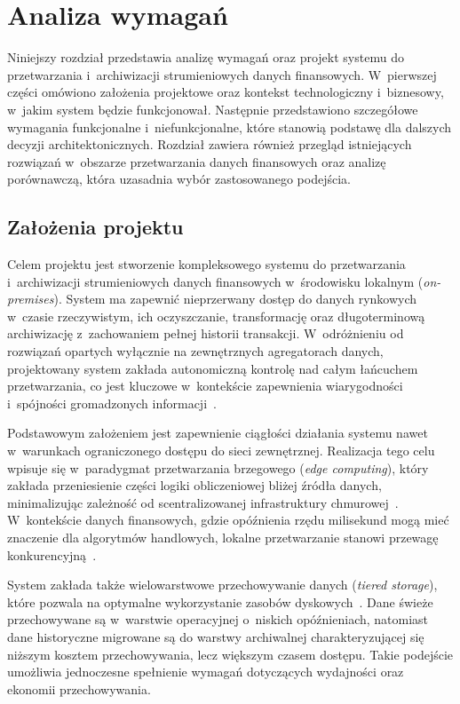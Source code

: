 \chapter{Analiza wymagań}
\label{ch:analiza}

Niniejszy rozdział przedstawia analizę wymagań oraz projekt systemu do przetwarzania i~archiwizacji strumieniowych
danych finansowych.
W~pierwszej części omówiono założenia projektowe oraz kontekst technologiczny i~biznesowy, w~jakim system będzie
funkcjonował.
Następnie przedstawiono szczegółowe wymagania funkcjonalne i~niefunkcjonalne, które stanowią podstawę dla dalszych
decyzji architektonicznych.
Rozdział zawiera również przegląd istniejących rozwiązań w~obszarze przetwarzania danych finansowych oraz analizę
porównawczą, która uzasadnia wybór zastosowanego podejścia.


\section{Założenia projektu}
\label{sec:zalozenia}

Celem projektu jest stworzenie kompleksowego systemu do przetwarzania i~archiwizacji strumieniowych danych finansowych
w~środowisku lokalnym (\textit{on-premises}).
System ma zapewnić nieprzerwany dostęp do danych rynkowych w~czasie rzeczywistym, ich oczyszczanie, transformację oraz
długoterminową archiwizację z~zachowaniem pełnej historii transakcji.
W~odróżnieniu od rozwiązań opartych wyłącznie na zewnętrznych agregatorach danych, projektowany system zakłada
autonomiczną kontrolę nad całym łańcuchem przetwarzania, co jest kluczowe w~kontekście zapewnienia wiarygodności
i~spójności gromadzonych informacji~\cite{arbitrage_finance}.

Podstawowym założeniem jest zapewnienie ciągłości działania systemu nawet w~warunkach ograniczonego dostępu do sieci
zewnętrznej.
Realizacja tego celu wpisuje się w~paradygmat przetwarzania brzegowego (\textit{edge computing}), który zakłada
przeniesienie części logiki obliczeniowej bliżej źródła danych, minimalizując zależność od scentralizowanej
infrastruktury chmurowej~\cite{edge_computing_satya}.
W~kontekście danych finansowych, gdzie opóźnienia rzędu milisekund mogą mieć znaczenie dla algorytmów handlowych,
lokalne przetwarzanie stanowi przewagę konkurencyjną~\cite{hft_colocation_advantage}.

System zakłada także wielowarstwowe przechowywanie danych (\textit{tiered storage}), które pozwala na optymalne
wykorzystanie zasobów dyskowych~\cite{unity_tiered_storage}.
Dane świeże przechowywane są w~warstwie operacyjnej o~niskich opóźnieniach, natomiast dane
historyczne migrowane są do warstwy archiwalnej charakteryzującej się niższym kosztem przechowywania, lecz większym
czasem dostępu.
Takie podejście umożliwia jednoczesne spełnienie wymagań dotyczących wydajności oraz ekonomii przechowywania.

